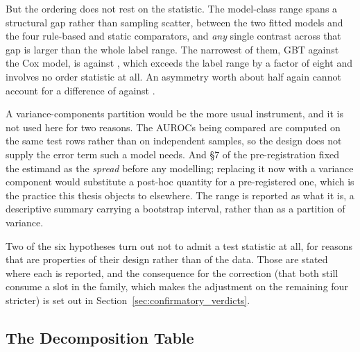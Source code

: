 But the ordering does not rest on the statistic. The model-class range
spans a structural gap rather than sampling scatter, between the two fitted
models and the four rule-based and static comparators, and \emph{any} single
contrast across that gap is larger than the whole label range. The narrowest of
them, GBT against the Cox model, is \pcAurocGbtB{} against \pcAurocCoxB, which
exceeds the label range by a factor of eight and involves no order statistic at
all. An asymmetry worth about half again cannot account for a difference of
\pcSpreadModelClass{} against \pcSpreadLabel.

A variance-components partition would be the more usual instrument, and it is
not used here for two reasons. The AUROCs being compared are computed on the
same test rows rather than on independent samples, so the design does not supply
the error term such a model needs. And \S7 of the pre-registration fixed the
estimand as the \emph{spread} before any modelling; replacing it now with a
variance component would substitute a post-hoc quantity for a pre-registered
one, which is the practice this thesis objects to elsewhere. The range is
reported as what it is, a descriptive summary carrying a bootstrap interval,
rather than as a partition of variance.

Two of the six hypotheses turn out not to admit a test statistic at all, for
reasons that are properties of their design rather than of the data. Those are
stated where each is reported, and the consequence for the correction (that both still consume a slot in the family, which makes the adjustment on the
remaining four stricter) is set out in
Section~\ref{sec:confirmatory_verdicts}.

\subsection{The Decomposition Table}

